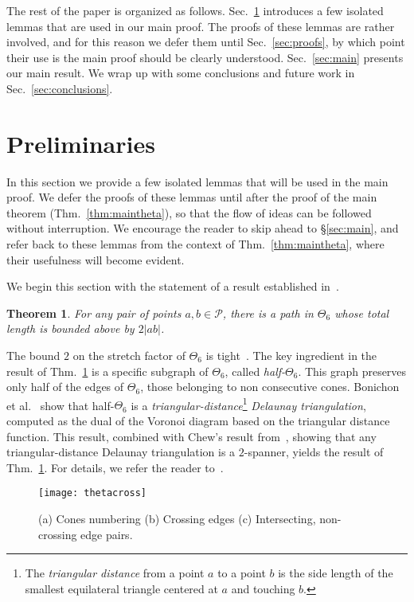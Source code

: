 \documentclass[11pt]{article}
\newcommand\Pt{\mathcal P}
\newtheorem{theorem}{{\bf Theorem}}
\begin{document}
The rest of the paper is organized as follows. Sec.~\ref{sec:basic} introduces a few isolated lemmas that are used in our main proof. The proofs of these lemmas are rather involved, and for this reason we defer them until Sec.~\ref{sec:proofs}, by which point their use is the main proof should be clearly understood. Sec.~\ref{sec:main} presents our main result. We wrap up with some conclusions and future work in Sec.~\ref{sec:conclusions}.

\section{Preliminaries}
\label{sec:basic}
In this section we provide a few isolated lemmas that will be used in the main proof. We defer the proofs of these lemmas until after the proof of the main theorem (Thm.~\ref{thm:maintheta}), so that the flow of ideas can be followed without interruption. We encourage the reader to skip ahead to \S\ref{sec:main}, and refer back to these lemmas from the context of Thm.~\ref{thm:maintheta}, where their usefulness will become evident.

\medskip
\noindent
We begin this section with the statement of a result established in~\cite{Bon+10}.

\begin{theorem}
For any pair of points $a, b\in \Pt$, there is a path in $\Theta_6$
whose total length is bounded above by $2|ab|$.
~\emph{\cite{Bon+10}}
\label{thm:theta6}
\end{theorem}
The bound $2$ on the stretch factor of $\Theta_6$ is tight~\cite{Bon+10}. The key ingredient in the result of Thm.~\ref{thm:theta6} is a specific subgraph of $\Theta_6$, called \emph{half-}$\Theta_6$. This graph preserves only half of the edges of $\Theta_6$, those belonging to non
consecutive cones. Bonichon et al.~\cite{Bon+10} show that half-$\Theta_6$ is a
\emph{triangular-distance}\footnote{The \emph{triangular distance} from a point $a$ to a point $b$
is the side length of the smallest equilateral triangle centered at $a$ and touching $b$.}
\emph{Delaunay triangulation}, computed as the dual of the Voronoi diagram based on
the triangular distance function.
This result, combined with Chew's result from~\cite{Chew89}, showing that any triangular-distance Delaunay triangulation is a $2$-spanner, yields the result of Thm.~\ref{thm:theta6}. For details, we refer the reader
to~\cite{Bon+10}.


\begin{figure}[htpb]
\centering
\texttt{[image: thetacross]}
\caption{(a) Cones numbering (b) Crossing edges (c) Intersecting, non-crossing edge pairs.}
\label{fig:thetacross}
\end{figure}
\end{document}
